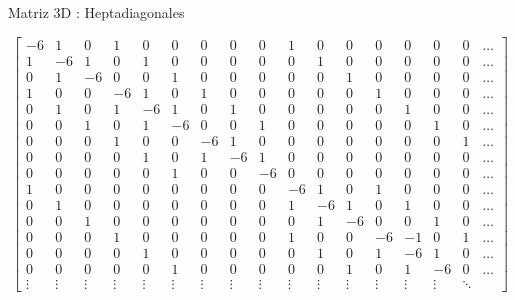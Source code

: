 \documentclass[handout]{beamer}
\begin{document}
\begin{frame}{Matriz 3D : Heptadiagonales}

\begin{scriptsize}
\[
\left[
\begin{array}{ccc|ccc|ccc||ccc|ccc|cc}
-6 & 1 & 0 & 1 & 0 & 0 & 0 & 0 & 0 & 1 & 0 & 0 & 0 & 0 & 0 & 0 & \dots\\
 1 &-6 & 1 & 0 & 1 & 0 & 0 & 0 & 0 & 0 & 1 & 0 & 0 & 0 & 0 & 0 & \dots\\
 0 & 1 &-6 & 0 & 0 & 1 & 0 & 0 & 0 & 0 & 0 & 1 & 0 & 0 & 0 & 0 & \dots\\
 \hline
 1 & 0 & 0 &-6 & 1 & 0 & 1 & 0 & 0 & 0 & 0 & 0 & 1 & 0 & 0 & 0 & \dots\\
 0 & 1 & 0 & 1 &-6 & 1 & 0 & 1 & 0 & 0 & 0 & 0 & 0 & 1 & 0 & 0 & \dots\\
 0 & 0 & 1 & 0 & 1 &-6 & 0 & 0 & 1 & 0 & 0 & 0 & 0 & 0 & 1 & 0 & \dots\\
 \hline
 0 & 0 & 0 & 1 & 0 & 0 &-6 & 1 & 0 & 0 & 0 & 0 & 0 & 0 & 0 & 1 & \dots\\
 0 & 0 & 0 & 0 & 1 & 0 & 1 &-6 & 1 & 0 & 0 & 0 & 0 & 0 & 0 & 0 & \dots\\
 0 & 0 & 0 & 0 & 0 & 1 & 0 & 0 &-6 & 0 & 0 & 0 & 0 & 0 & 0 & 0 & \dots\\
 \hline
 \hline
 1 & 0 & 0 & 0 & 0 & 0 & 0 & 0 & 0 &-6 & 1 & 0 & 1 & 0 & 0 & 0 & \dots\\
 0 & 1 & 0 & 0 & 0 & 0 & 0 & 0 & 0 & 1 &-6 & 1 & 0 & 1 & 0 & 0 & \dots\\
 0 & 0 & 1 & 0 & 0 & 0 & 0 & 0 & 0 &0 & 1 &-6 & 0 & 0 & 1 & 0 & \dots\\
 \hline
 0 & 0 & 0 & 1 & 0 & 0 & 0 & 0 & 0 & 1 & 0 & 0 &-6 &-1 & 0 & 1 & \dots\\
 0 & 0 & 0 & 0 & 1 & 0 & 0 & 0 & 0 & 0 & 1 & 0 & 1 &-6 & 1 & 0 & \dots\\
 0 & 0 & 0 & 0 & 0 & 1 & 0 & 0 & 0 & 0 & 0 & 1 & 0 & 1 &-6 & 0 & \dots\\
 \vdots & \vdots & \vdots & \vdots & \vdots & \vdots & \vdots & \vdots & \vdots & \vdots 
 & \vdots & \vdots & \vdots & \vdots & \vdots
 & \ddots 
\end{array} \right]
\]
\end{scriptsize}
  
\end{frame}
\end{document}
